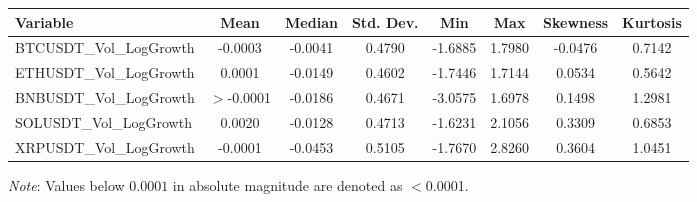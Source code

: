 \begin{tabular}{lccccccc}
  \toprule
  \textbf{Variable} & \textbf{Mean} & \textbf{Median} & \textbf{Std. Dev.} & \textbf{Min} & \textbf{Max} & \textbf{Skewness} & \textbf{Kurtosis} \\ 
  \midrule
  BTCUSDT\_Vol\_LogGrowth & -0.0003 & -0.0041 & 0.4790 & -1.6885 & 1.7980 & -0.0476 & 0.7142 \\ 
  ETHUSDT\_Vol\_LogGrowth & 0.0001 & -0.0149 & 0.4602 & -1.7446 & 1.7144 & 0.0534 & 0.5642 \\ 
  BNBUSDT\_Vol\_LogGrowth & $>$-0.0001 & -0.0186 & 0.4671 & -3.0575 & 1.6978 & 0.1498 & 1.2981 \\ 
  SOLUSDT\_Vol\_LogGrowth & 0.0020 & -0.0128 & 0.4713 & -1.6231 & 2.1056 & 0.3309 & 0.6853 \\ 
  XRPUSDT\_Vol\_LogGrowth & -0.0001 & -0.0453 & 0.5105 & -1.7670 & 2.8260 & 0.3604 & 1.0451 \\ 
  \bottomrule
\end{tabular}
\par\vspace{4pt}
\begin{minipage}{\linewidth}
  \footnotesize \textit{Note}: Values below $0.0001$ in absolute magnitude are denoted as $<$0.0001.
\end{minipage}